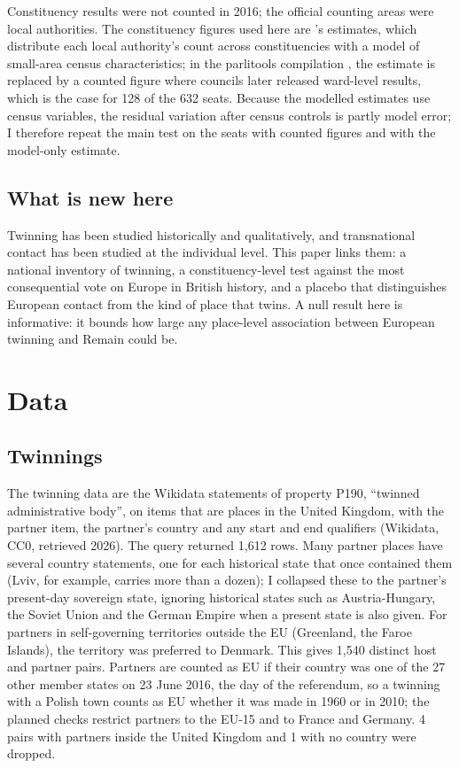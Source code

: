 \documentclass[11pt,a4paper]{article}
\begin{document}
Constituency results were not counted in 2016; the official counting areas were local authorities. The constituency figures used here are \citet{hanretty2017}'s estimates, which distribute each local authority's count across constituencies with a model of small-area census characteristics; in the parlitools compilation \citep{parlitools}, the estimate is replaced by a counted figure where councils later released ward-level results, which is the case for 128 of the 632 seats. Because the modelled estimates use census variables, the residual variation after census controls is partly model error; I therefore repeat the main test on the seats with counted figures and with the model-only estimate.

\subsection{What is new here}
Twinning has been studied historically and qualitatively, and transnational contact has been studied at the individual level. This paper links them: a national inventory of twinning, a constituency-level test against the most consequential vote on Europe in British history, and a placebo that distinguishes European contact from the kind of place that twins. A null result here is informative: it bounds how large any place-level association between European twinning and Remain could be.

\section{Data}\label{sec:data}
\subsection{Twinnings}
The twinning data are the Wikidata statements of property P190, ``twinned administrative body'', on items that are places in the United Kingdom, with the partner item, the partner's country and any start and end qualifiers (Wikidata, CC0, retrieved 2026). The query returned 1,612 rows. Many partner places have several country statements, one for each historical state that once contained them (Lviv, for example, carries more than a dozen); I collapsed these to the partner's present-day sovereign state, ignoring historical states such as Austria-Hungary, the Soviet Union and the German Empire when a present state is also given. For partners in self-governing territories outside the EU (Greenland, the Faroe Islands), the territory was preferred to Denmark. This gives 1,540 distinct host and partner pairs. Partners are counted as EU if their country was one of the 27 other member states on 23 June 2016, the day of the referendum, so a twinning with a Polish town counts as EU whether it was made in 1960 or in 2010; the planned checks restrict partners to the EU-15 and to France and Germany. 4 pairs with partners inside the United Kingdom and 1 with no country were dropped.
\end{document}
